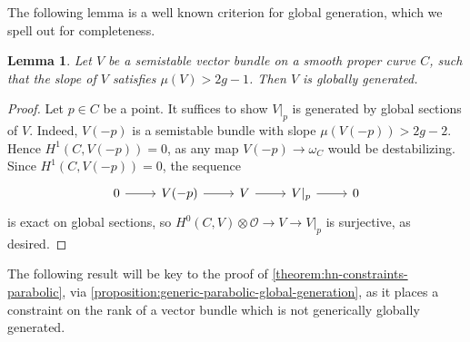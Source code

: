 \documentclass[12 pt]{amsart}
\theoremstyle{plain}
\newtheorem{lemma}[subsubsection]{Lemma}
\theoremstyle{definition}
\theoremstyle{remark}
\numberwithin{equation}{section}
\begin{document}
The following lemma is a well known criterion for global generation, which we
spell out for completeness.
\begin{lemma}
	\label{lemma:global-generation}
	Let $V$ be a semistable vector bundle on a smooth proper curve $C$, such that the slope of $V$ satisfies $\mu(V)> 2g - 1$. Then
	$V$ is globally generated.
\end{lemma}
\begin{proof}
	Let $p\in C$ be a point. It suffices to show $V|_p$ is generated by global sections of $V$. Indeed, $V(-p)$ is a semistable bundle with slope $\mu(V(-p)) > 2g-2$. Hence
	 $H^1(C, V(-p)) = 0$, as any map $V(-p) \to \omega_C$ would be
	destabilizing.
	Since $H^1(C, V(-p)) = 0$, the sequence
	\begin{equation}
		\label{equation:}
		\begin{tikzcd}
			0 \ar {r} & V(-p) \ar {r} & V \ar {r} & V|_p \ar {r}
			& 0 
	\end{tikzcd}\end{equation}
	is exact on global sections, so
	$H^0(C, V) \otimes \mathscr O \to V \to V|_p$ is surjective, as desired.
\end{proof}

The following result will be key to the proof of
\autoref{theorem:hn-constraints-parabolic}, via
\autoref{proposition:generic-parabolic-global-generation},
as it places a constraint on the rank of a
vector bundle which is not generically globally generated.
\end{document}
